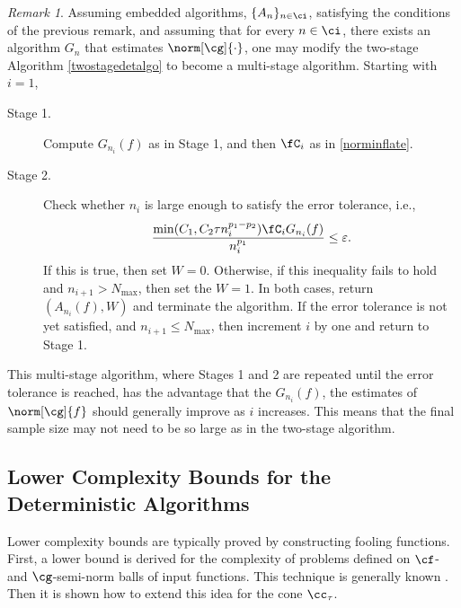 \documentclass[final]{elsarticle}
\theoremstyle{definition}
\theoremstyle{remark}
\newtheorem{rem}{Remark}
\begin{document}
\begin{rem} Assuming embedded algorithms, $\{A_n\}_{n \in \ci}$, satisfying the conditions of the previous remark, and assuming that for every $n \in \ci$, there exists an algorithm $G_n$ that estimates $\norm[\cg]{\cdot}$, one may modify the two-stage Algorithm \ref{twostagedetalgo} to become a multi-stage algorithm.  Starting with $i=1$, 

\begin{description}

\item [Stage 1.] Compute $G_{n_i}(f)$ as in Stage 1, and then $\fC_{i}$ as in \eqref{norminflate}.  

\item [Stage 2.] Check whether $n_i$ is large enough to satisfy the error tolerance, i.e., 
\[
\frac{\min(C_1,C_2\tau n_i^{p_1-p_2})\fC_i G_{n_i}(f)}{n_i^{p_1}} \le \varepsilon.
\]
If this is true, then set $W=0$.  Otherwise, if this inequality fails to hold and $n_{i+1} > N_{\max}$, then set the $W=1$.  In both cases, return $(A_{n_i}(f),W)$ and terminate the algorithm.  If the error tolerance is not yet satisfied, and $n_{i+1} \le N_{\max}$, then increment $i$ by one and return to Stage 1.
\end{description}

This multi-stage algorithm, where Stages 1 and 2 are repeated until the error tolerance is reached, has the advantage that the $ G_{n_i}(f)$, the estimates of $\norm[\cg]{f}$ should generally improve as $i$ increases.  This means that the final sample size may not need to be so large as in the two-stage algorithm.
\end{rem}

\subsection{Lower Complexity Bounds for the Deterministic Algorithms}
Lower complexity bounds are typically proved by constructing fooling functions.  First, a lower bound is derived for the complexity of problems defined on $\cf$- and $\cg$-semi-norm balls of input functions.  This technique is generally known \cite{???}.  Then it is shown how to extend this idea for the cone $\cc_{\tau}$.  
\end{document}
